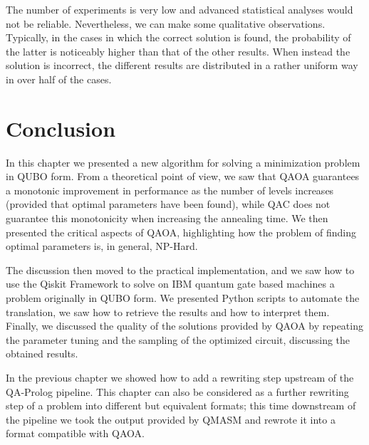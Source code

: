 The number of experiments is very low and advanced statistical analyses would not be reliable. Nevertheless, we can make some qualitative observations. Typically, in the cases in which the correct solution is found, the probability of the latter is noticeably higher than that of the other results. When instead the solution is incorrect, the different results are distributed in a rather uniform way in over half of the cases.

\section{Conclusion}
In this chapter we presented a new algorithm for solving a minimization problem in QUBO form. From a theoretical point of view, we saw that QAOA guarantees a monotonic improvement in performance as the number of levels increases (provided that optimal parameters have been found), while QAC does not guarantee this monotonicity when increasing the annealing time. We then presented the critical aspects of QAOA, highlighting how the problem of finding optimal parameters is, in general, NP-Hard.

The discussion then moved to the practical implementation, and we saw how to use the Qiskit Framework to solve on IBM quantum gate based machines a problem originally in QUBO form. We presented Python scripts to automate the translation, we saw how to retrieve the results and how to interpret them. Finally, we discussed the quality of the solutions provided by QAOA by repeating the parameter tuning and the sampling of the optimized circuit, discussing the obtained results.

In the previous chapter we showed how to add a rewriting step upstream of the QA-Prolog pipeline. This chapter can also be considered as a further rewriting step of a problem into different but equivalent formats; this time downstream of the pipeline we took the output provided by QMASM and rewrote it into a format compatible with QAOA.